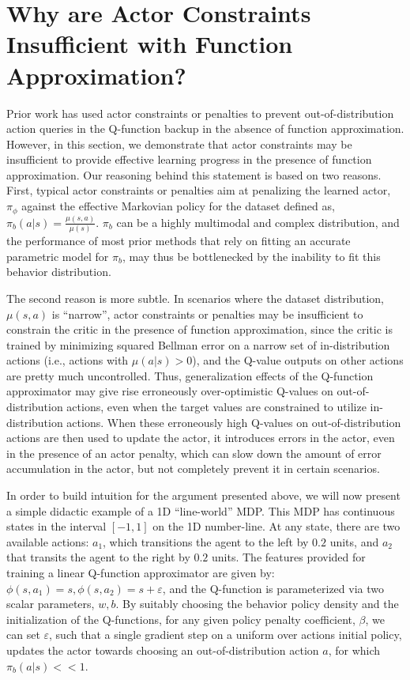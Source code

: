 \section{Why are Actor Constraints Insufficient with Function Approximation?}

Prior work has used actor constraints or penalties to prevent out-of-distribution action queries in the Q-function backup in the absence of function approximation. However, in this section, we demonstrate that actor constraints may be insufficient to provide effective learning progress in the presence of function approximation.
Our reasoning behind this statement is based on two reasons.
First, typical actor constraints or penalties aim at penalizing the learned actor, $\pi_\phi$ against
the effective Markovian policy for the dataset
defined as, $\pi_b(a|s) = \frac{\mu(s, a)}{\mu(s)}$. $\pi_b$ can be a highly multimodal and complex distribution, and the performance of most prior methods that rely on fitting an accurate parametric model for $\pi_b$, may thus be bottlenecked by the inability to fit this behavior distribution.

The second reason is more subtle. In scenarios where the dataset distribution, $\mu(s, a)$ is ``narrow'',
actor constraints or penalties may be insufficient to constrain the critic in the presence of function approximation, since the critic is trained by minimizing squared Bellman error on a narrow set of in-distribution actions (i.e., actions with $\mu(a|s) > 0$), and the Q-value outputs on other actions are pretty much uncontrolled.
Thus, generalization effects of the Q-function approximator may give rise erroneously over-optimistic Q-values on out-of-distribution actions, even when the target values are constrained to utilize in-distribution actions. When these erroneously high Q-values on out-of-distribution actions are then used to update the actor, it introduces errors in the actor, even in the presence of an actor penalty, which can slow down the amount of error accumulation in the actor, but not completely prevent it in certain scenarios.

In order to build intuition for the argument presented above, we will now present a simple didactic example of a 1D ``line-world'' MDP. This MDP has continuous states in the interval $[-1, 1]$ on the 1D number-line. At any state, there are two available actions: $a_1$, which transitions the agent to the left by $0.2$ units, and $a_2$ that transits the agent to the right by $0.2$ units.
The features provided for training a linear Q-function approximator are given by: $\phi(s, a_1) = s, \phi(s, a_2) = s + \varepsilon$, and the Q-function is parameterized via two scalar parameters, $w, b$. By suitably choosing the behavior policy density and the initialization of the Q-functions, for any given policy penalty coefficient, $\beta$,
we can set $\varepsilon$, such that a single gradient step on a uniform over actions initial policy, updates the actor towards choosing an out-of-distribution action $a$, for which $\pi_b(a|s) << 1$. 

